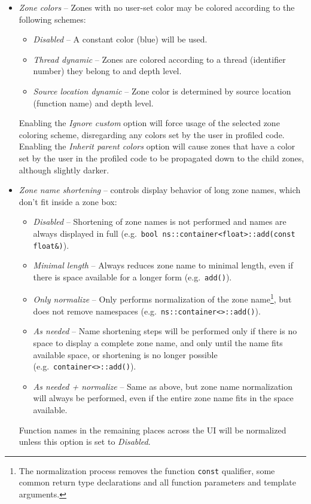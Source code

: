 \documentclass[hidelinks,titlepage,a4paper,twoside]{article}
\begin{document}
\begin{itemize}
\begin{itemize}
\item \emph{\faPalette{} Zone colors} -- Zones with no user-set color may be colored according to the following schemes:
\begin{itemize}
\item \emph{Disabled} -- A constant color (blue) will be used.
\item \emph{Thread dynamic} -- Zones are colored according to a thread (identifier number) they belong to and depth level.
\item \emph{Source location dynamic} -- Zone color is determined by source location (function name) and depth level.
\end{itemize}
Enabling the \emph{Ignore custom} option will force usage of the selected zone coloring scheme, disregarding any colors set by the user in profiled code.
Enabling the \emph{Inherit parent colors} option will cause zones that have a color set by the user in the profiled code to be propagated down to the child zones, although slightly darker.
\item \emph{\faRulerHorizontal{} Zone name shortening} -- controls display behavior of long zone names, which don't fit inside a zone box:
\begin{itemize}
\item \emph{Disabled} -- Shortening of zone names is not performed and names are always displayed in full (e.g.\ \texttt{bool ns::container<float>::add(const float\&)}).
\item \emph{Minimal length} -- Always reduces zone name to minimal length, even if there is space available for a longer form (e.g.\ \texttt{add()}).
\item \emph{Only normalize} -- Only performs normalization of the zone name\footnote{The normalization process removes the function \texttt{const} qualifier, some common return type declarations and all function parameters and template arguments.}, but does not remove namespaces (e.g.\ \texttt{ns::container<>::add()}).
\item \emph{As needed} -- Name shortening steps will be performed only if there is no space to display a complete zone name, and only until the name fits available space, or shortening is no longer possible (e.g.\ \texttt{container<>::add()}).
\item \emph{As needed + normalize} -- Same as above, but zone name normalization will always be performed, even if the entire zone name fits in the space available.
\end{itemize}
Function names in the remaining places across the UI will be normalized unless this option is set to \emph{Disabled}.

\end{itemize}
\end{itemize}
\end{document}
